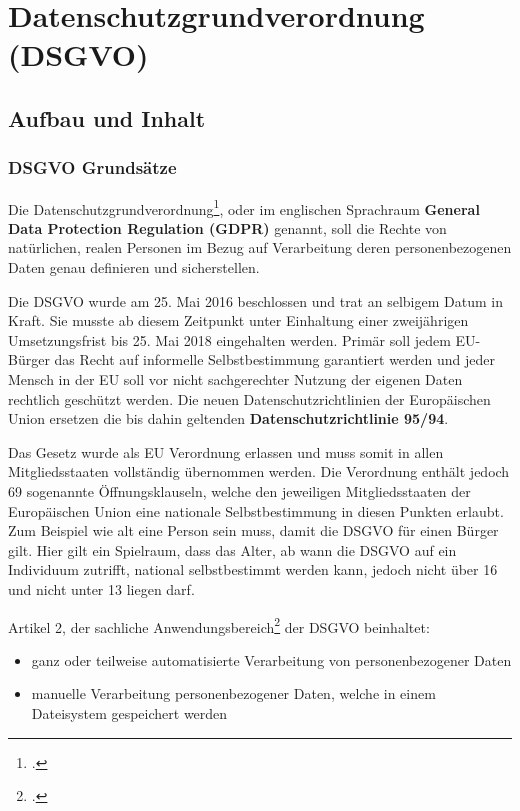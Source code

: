 \chapter{Datenschutzgrundverordnung (DSGVO)}
\putz

\section{Aufbau und Inhalt}
\subsection{DSGVO Grundsätze}
Die Datenschutzgrundverordnung\footcite{dsgvo-wiki}, oder im englischen Sprachraum \textbf{General Data Protection Regulation (GDPR)} genannt, soll die Rechte von natürlichen, realen Personen im Bezug auf Verarbeitung deren personenbezogenen Daten genau definieren und sicherstellen.

Die DSGVO wurde am 25. Mai 2016 beschlossen und trat an selbigem Datum in Kraft. Sie musste ab diesem Zeitpunkt unter Einhaltung einer zweijährigen Umsetzungsfrist bis 25. Mai 2018 eingehalten werden. Primär soll jedem EU-Bürger das Recht auf informelle Selbstbestimmung garantiert werden und jeder Mensch in der EU soll vor nicht sachgerechter Nutzung der eigenen Daten rechtlich geschützt werden.
Die neuen Datenschutzrichtlinien der Europäischen Union ersetzen die bis dahin geltenden \textbf{Datenschutzrichtlinie 95/94}.

Das Gesetz wurde als EU Verordnung erlassen und muss somit in allen Mitgliedsstaaten vollständig übernommen werden.
Die Verordnung enthält jedoch 69 sogenannte Öffnungsklauseln, welche den jeweiligen Mitgliedsstaaten der Europäischen Union eine nationale Selbstbestimmung in diesen Punkten erlaubt.
Zum Beispiel wie alt eine Person sein muss, damit die DSGVO für einen Bürger gilt.
Hier gilt ein Spielraum, dass das Alter, ab wann die DSGVO auf ein Individuum zutrifft, national selbstbestimmt werden kann, jedoch nicht über 16 und nicht unter 13 liegen darf.

Artikel 2, der sachliche Anwendungsbereich\footcite{Lehrunterlagen-HTL-cloud} der DSGVO beinhaltet:
\begin{itemize}
	\item ganz oder teilweise automatisierte Verarbeitung von personenbezogener Daten
	\item manuelle Verarbeitung personenbezogener Daten, welche in einem Dateisystem gespeichert werden
\end{itemize}

